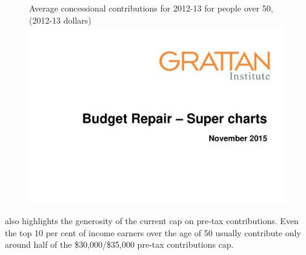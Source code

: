 \documentclass{grattanAlpha}
\begin{document}
\begin{figure}
%
{Average concessional contributions for 2012-13 for people over 50, (2012-13 dollars)}\label{fig:SUPER-4-4}
\includegraphics[width=\columnwidth,page=22]{super-atlas/PPTX.pdf}
\end{figure}

 also highlights the generosity of the current cap on pre-tax contributions. Even the top 10 per cent of income earners over the age of 50 usually contribute only around half of the \$30,000/\$35,000 pre-tax contributions cap. 
\end{document}
